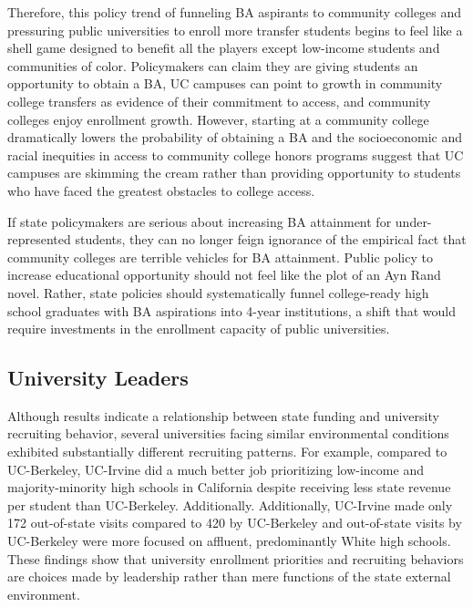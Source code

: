 \documentclass[twoside]{article}
\begin{document}
Therefore, this policy trend of funneling BA aspirants to community colleges and pressuring public universities to enroll more transfer students begins to feel like a shell game designed to benefit all the players except low-income students and communities of color. Policymakers can claim they are giving students an opportunity to obtain a BA, UC campuses can point to growth in community college transfers as evidence of their commitment to access, and community colleges enjoy enrollment growth. However, starting at a community college dramatically lowers the probability of obtaining a BA and the socioeconomic and racial inequities in access to community college honors programs suggest that UC campuses are skimming the cream rather than providing opportunity to students who have faced the greatest obstacles to college access.

If state policymakers are serious about increasing BA attainment for under-represented students, they can no longer feign ignorance of the empirical fact that community colleges are terrible vehicles for BA attainment. Public policy to increase educational opportunity should not feel like the plot of an Ayn Rand novel. Rather, state policies should systematically funnel college-ready high school graduates with BA aspirations into 4-year institutions, a shift that would require investments in the enrollment capacity of public universities.

\subsection*{University Leaders}

Although results indicate a relationship between state funding and university recruiting behavior, several universities facing similar environmental conditions exhibited substantially different recruiting patterns. For example, compared to UC-Berkeley, UC-Irvine did a much better job prioritizing low-income and majority-minority high schools in California despite receiving less state revenue per student than UC-Berkeley. Additionally.  Additionally, UC-Irvine made only 172 out-of-state visits compared to 420 by UC-Berkeley and out-of-state visits by UC-Berkeley were more focused on affluent, predominantly White high schools.  These findings show that university enrollment priorities and recruiting behaviors are choices made by leadership rather than mere functions of the state external environment.
\end{document}
